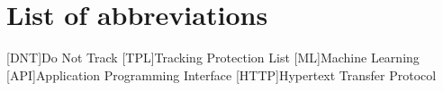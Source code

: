\documentclass[oneside,11pt,titlepage,ngerman,a4paper,bibliography=totocnumbered,listof=numbered]{scrbook}
\begin{document}

\frontmatter



% 

\tableofcontents{}
\listoffigures{}
\chapter{List of abbreviations}
\begin{acronym}[eugh]
[DNT]{Do Not Track}
[TPL]{Tracking Protection List}
[ML]{Machine Learning}
[API]{Application Programming Interface}
[HTTP]{Hypertext Transfer Protocol}
\end{acronym}
\mainmatter









\backmatter

\listoftables


\setwidesite{}						%
\label{cha:bibliography}





%	
\end{document}
